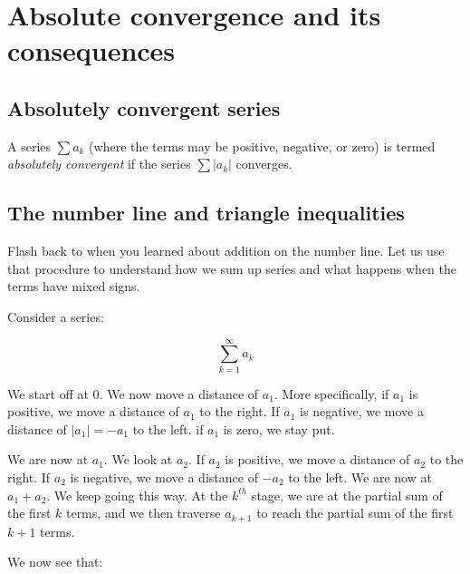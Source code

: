 \documentclass[10pt]{amsart}
\begin{document}
\section{Absolute convergence and its consequences}

\subsection{Absolutely convergent series}

A series $\sum a_k$ (where the terms may be positive, negative, or
zero) is termed {\em absolutely convergent} if the series $\sum |a_k|$
converges.

\subsection{The number line and triangle inequalities}

Flash back to when you learned about addition on the number line. Let
us use that procedure to understand how we sum up series and what
happens when the terms have mixed signs.

Consider a series:

$$\sum_{k=1}^\infty a_k$$

We start off at $0$. We now move a distance of $a_1$. More
specifically, if $a_1$ is positive, we move a distance of $a_1$ to the
right. If $a_1$ is negative, we move a distance of $|a_1| = -a_1$ to
the left. if $a_1$ is zero, we stay put.

We are now at $a_1$. We look at $a_2$. If $a_2$ is positive, we move a
distance of $a_2$ to the right. If $a_2$ is negative, we move a
distance of $-a_2$ to the left. We are now at $a_1 + a_2$. We keep
going this way. At the $k^{th}$ stage, we are at the partial sum of
the first $k$ terms, and we then traverse $a_{k+1}$ to reach the
partial sum of the first $k + 1$ terms.

We now see that:
\end{document}
